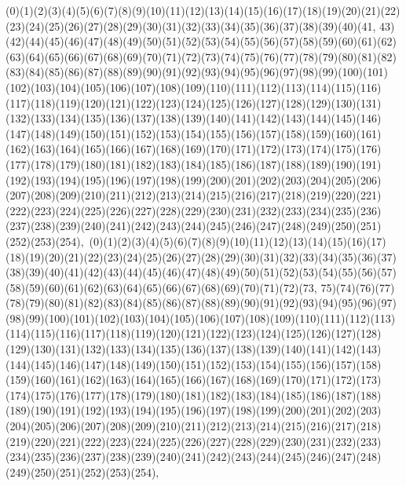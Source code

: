 \documentclass[12pt]{article}
\begin{document}
{(0)(1)(2)(3)(4)(5)(6)(7)(8)(9)(10)(11)(12)(13)(14)(15)(16)(17)(18)(19)(20)(21)(22)(23)(24)(25)(26)(27)(28)(29)(30)(31)(32)(33)(34)(35)(36)(37)(38)(39)(40)(41, 43)(42)(44)(45)(46)(47)(48)(49)(50)(51)(52)(53)(54)(55)(56)(57)(58)(59)(60)(61)(62)(63)(64)(65)(66)(67)(68)(69)(70)(71)(72)(73)(74)(75)(76)(77)(78)(79)(80)(81)(82)(83)(84)(85)(86)(87)(88)(89)(90)(91)(92)(93)(94)(95)(96)(97)(98)(99)(100)(101)(102)(103)(104)(105)(106)(107)(108)(109)(110)(111)(112)(113)(114)(115)(116)(117)(118)(119)(120)(121)(122)(123)(124)(125)(126)(127)(128)(129)(130)(131)(132)(133)(134)(135)(136)(137)(138)(139)(140)(141)(142)(143)(144)(145)(146)(147)(148)(149)(150)(151)(152)(153)(154)(155)(156)(157)(158)(159)(160)(161)(162)(163)(164)(165)(166)(167)(168)(169)(170)(171)(172)(173)(174)(175)(176)(177)(178)(179)(180)(181)(182)(183)(184)(185)(186)(187)(188)(189)(190)(191)(192)(193)(194)(195)(196)(197)(198)(199)(200)(201)(202)(203)(204)(205)(206)(207)(208)(209)(210)(211)(212)(213)(214)(215)(216)(217)(218)(219)(220)(221)(222)(223)(224)(225)(226)(227)(228)(229)(230)(231)(232)(233)(234)(235)(236)(237)(238)(239)(240)(241)(242)(243)(244)(245)(246)(247)(248)(249)(250)(251)(252)(253)(254)$
, 
$
(0)(1)(2)(3)(4)(5)(6)(7)(8)(9)(10)(11)(12)(13)(14)(15)(16)(17)(18)(19)(20)(21)(22)(23)(24)(25)(26)(27)(28)(29)(30)(31)(32)(33)(34)(35)(36)(37)(38)(39)(40)(41)(42)(43)(44)(45)(46)(47)(48)(49)(50)(51)(52)(53)(54)(55)(56)(57)(58)(59)(60)(61)(62)(63)(64)(65)(66)(67)(68)(69)(70)(71)(72)(73, 75)(74)(76)(77)(78)(79)(80)(81)(82)(83)(84)(85)(86)(87)(88)(89)(90)(91)(92)(93)(94)(95)(96)(97)(98)(99)(100)(101)(102)(103)(104)(105)(106)(107)(108)(109)(110)(111)(112)(113)(114)(115)(116)(117)(118)(119)(120)(121)(122)(123)(124)(125)(126)(127)(128)(129)(130)(131)(132)(133)(134)(135)(136)(137)(138)(139)(140)(141)(142)(143)(144)(145)(146)(147)(148)(149)(150)(151)(152)(153)(154)(155)(156)(157)(158)(159)(160)(161)(162)(163)(164)(165)(166)(167)(168)(169)(170)(171)(172)(173)(174)(175)(176)(177)(178)(179)(180)(181)(182)(183)(184)(185)(186)(187)(188)(189)(190)(191)(192)(193)(194)(195)(196)(197)(198)(199)(200)(201)(202)(203)(204)(205)(206)(207)(208)(209)(210)(211)(212)(213)(214)(215)(216)(217)(218)(219)(220)(221)(222)(223)(224)(225)(226)(227)(228)(229)(230)(231)(232)(233)(234)(235)(236)(237)(238)(239)(240)(241)(242)(243)(244)(245)(246)(247)(248)(249)(250)(251)(252)(253)(254)$
, 
$
}
\end{document}
